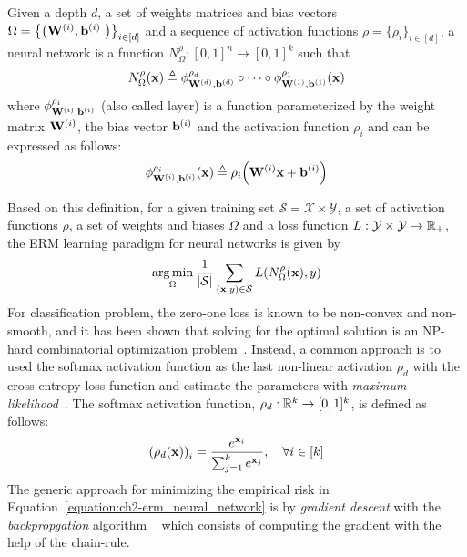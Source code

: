\begin{definition}
  Given a depth $d$, a set of weights matrices and bias vectors $\Omega = \left\{ \left( \Wmat^{(i)}, \bvec^{(i)} \right) \right\}_{i \in [d]}$ and a sequence of activation functions $\rho = \{\rho_i \}_{i \in [d]}$, a neural network is a function $N^\rho_\Omega : [0, 1]^n \rightarrow [0, 1]^k$ such that
  \begin{equation}
    N^\rho_{\Omega}(\mathbf{x}) \triangleq \phi^{\rho_d}_{\mathbf{W}^{(d)}, \mathbf{b}^{(d)}} \circ \cdots \circ \phi^{\rho_1}_{\mathbf{W}^{(1)}, \mathbf{b}^{(1)}}(\mathbf{x})
  \end{equation}
  where $\phi^{\rho_i}_{\mathbf{W}^{(i)},\mathbf{b}^{(i)}}$ (also called layer) is a function parameterized by the weight matrix $\mathbf{W}^{(i)}$, the bias vector $\mathbf{b}^{(i)}$ and the activation function $\rho_i$ and can be expressed as follows: 
  \begin{equation}
    \phi^{\rho_i}_{\Wmat^{(i)},\bvec^{(i)}} (\xvec) \triangleq \rho_i \left(\Wmat^{(i)}\xvec + \bvec^{(i)}\right)
  \end{equation}
\end{definition}


\noindent
Based on this definition, for a given training set $\mathcal{S} = \mathcal{X} \times \mathcal{Y}$, a set of activation functions $\rho$, a set of weights and biases $\Omega$ and a loss function $L: \mathcal{Y} \times \mathcal{Y} \rightarrow \mathbb{R}_+$, the ERM learning paradigm for neural networks is given by
\begin{equation}
  \operatorname*{arg\,min}_{\Omega} \frac{1}{|\mathcal{S}|} \sum_{(\mathbf{x}, y) \in \mathcal{S}} L(N^\rho_\Omega(\mathbf{x}), y) 
  \label{equation:ch2-erm_neural_network}
\end{equation}
For classification problem, the zero-one loss is known to be non-convex and non-smooth, and it has been shown that solving for the optimal solution is an NP-hard combinatorial optimization problem~\cite{feldman2012agnostic,bendavid2003difficulty}.
Instead, a common approach is to used the softmax activation function as the last non-linear activation $\rho_d$ with the cross-entropy loss function and estimate the parameters with \emph{maximum likelihood}~\cite{hastie2009elements}.
The softmax activation function, $\rho_d: \mathbb{R}^k \rightarrow [0, 1]^k$, is defined as follows:
\begin{equation}
  \leftmat \rho_d(\xvec) \rightmat_i = \frac{e^{\xvec_i}}{\sum_{j=1}^{k} e^{\xvec_j}}, \quad \forall i \in [k]
\end{equation}
The generic approach for minimizing the empirical risk in Equation~\ref{equation:ch2-erm_neural_network} is by \emph{gradient descent} with the \emph{backpropgation} algorithm ~\cite{rumelhart1986learning} which consists of computing the gradient with the help of the chain-rule.


